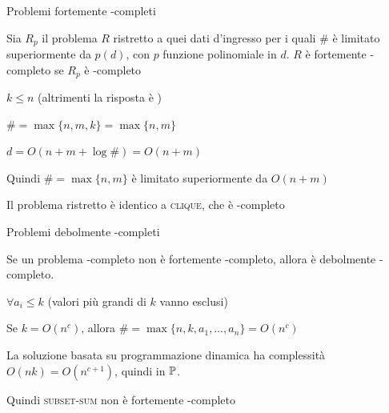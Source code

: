 \begin{frame}{Problemi fortemente \NP-completi}

\vspace{-9pt}
\begin{myboxtitle}[Definizione]
Sia $R_p$ il problema $R$ ristretto a quei dati d'ingresso per i quali \# è
limitato superiormente da $p(d)$, con $p$ funzione polinomiale in $d$. $R$ è
\alert{fortemente \NP-completo} se $R_p$ è \NP-completo
\end{myboxtitle}

\begin{myboxtitle}
\BIL
\item $k \leq n$ (altrimenti la risposta è \FALSE)
\item $\# = \max \{ n, m, k \} = \max \{ n, m \}$
\item $d = O(n + m + \log \#) = O(n+m)$
\item Quindi $\# = \max \{ n, m \}$ è limitato superiormente da $O(n+m)$
\item Il problema ristretto è identico a \textsc{clique}, che è \NP-completo
\EIL
\end{myboxtitle}

\end{frame}

\begin{frame}{Problemi debolmente \NP-completi}

\vspace{-9pt}
\begin{myboxtitle}[Definizione]
Se un problema \NP-completo non è fortemente \NP-completo, allora è \alert{debolmente \NP-completo}.    
\end{myboxtitle}

\begin{myboxtitle}
\BIL
\item $\forall a_i \leq k$ (valori più grandi di $k$ vanno esclusi)
\item Se $k=O(n^c)$, allora $\# = \max \{n, k, a_1, \ldots, a_n\} = O(n^c)$
\item La soluzione basata su programmazione dinamica ha complessità
$O(nk) = O(n^{c+1})$, quindi in $\mbox{\sc $\mathbb{P}$}$.
\item Quindi \textsc{subset-sum} non è fortemente \NP-completo
\EIL
\end{myboxtitle}

\end{frame}

